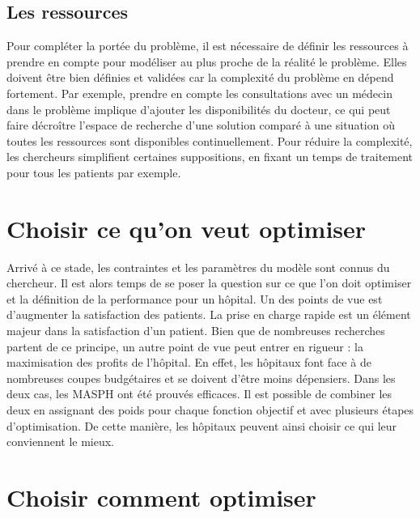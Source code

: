 \documentclass{polytech/polytech}
\begin{document}
\subsection{Les ressources}

Pour compléter la portée du problème, il est nécessaire de définir les ressources à prendre en compte pour modéliser au plus proche de la réalité le problème. Elles doivent être bien définies et validées car la complexité du problème en dépend fortement. Par exemple, prendre en compte les consultations avec un médecin dans le problème implique d'ajouter les disponibilités du docteur, ce qui peut faire décroître l'espace de recherche d'une solution comparé à une situation où toutes les ressources sont disponibles continuellement. Pour réduire la complexité, les chercheurs simplifient certaines suppositions, en fixant un temps de traitement pour tous les patients par exemple.


\section{Choisir ce qu'on veut optimiser}

Arrivé à ce stade, les contraintes et les paramètres du modèle sont connus du chercheur. Il est alors temps de se poser la question sur ce que l'on doit optimiser et la définition de la performance pour un hôpital. Un des points de vue est d'augmenter la satisfaction des patients. La prise en charge rapide est un élément majeur dans la satisfaction d'un patient. Bien que de nombreuses recherches partent de ce principe, un autre point de vue peut entrer en rigueur : la maximisation des profits de l'hôpital. En effet, les hôpitaux font face à de nombreuses coupes budgétaires et se doivent d'être moins dépensiers. Dans les deux cas, les MASPH ont été prouvés efficaces. Il est possible de combiner les deux en assignant des poids pour chaque fonction objectif et avec plusieurs étapes d'optimisation. De cette manière, les hôpitaux peuvent ainsi choisir ce qui leur conviennent le mieux. 


\section{Choisir comment optimiser}
\end{document}
